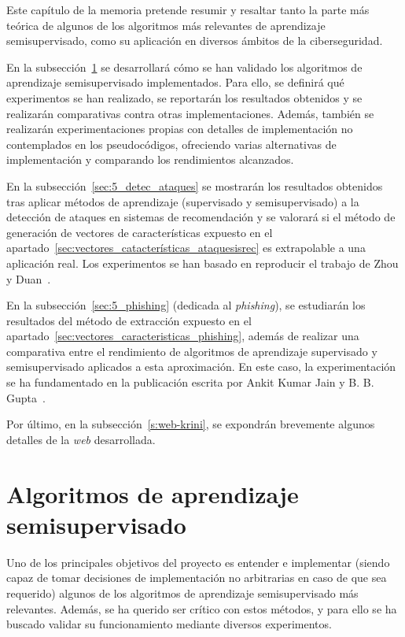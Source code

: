 \label{s:5}

Este capítulo de la memoria pretende resumir y resaltar tanto la parte más teórica de algunos de los algoritmos más relevantes de aprendizaje semisupervisado, como su aplicación en diversos ámbitos de la ciberseguridad.

En la subsección~\ref{sec:5_ssl} se desarrollará cómo se han validado los algoritmos de aprendizaje semisupervisado implementados. Para ello, se definirá qué experimentos se han realizado, se reportarán los resultados obtenidos y se realizarán comparativas contra otras implementaciones. Además, también se realizarán experimentaciones propias con detalles de implementación no contemplados en los pseudocódigos, ofreciendo varias alternativas de implementación y comparando los rendimientos alcanzados.

En la subsección~\ref{sec:5_detec_ataques} se mostrarán los resultados obtenidos tras aplicar métodos de aprendizaje (supervisado y semisupervisado) a la detección de ataques en sistemas de recomendación y se valorará si el método de generación de vectores de características expuesto en el apartado~\ref{sec:vectores_catacterísticas_ataquesisrec} es extrapolable a una aplicación real. Los experimentos se han basado en reproducir el trabajo de Zhou y Duan~\cite{zhou2021SemisupervisedRecommendationAttack}.

En la subsección~\ref{sec:5_phishing} (dedicada al \textit{phishing}), se estudiarán los resultados del método de extracción expuesto en el apartado~\ref{sec:vectores_caracteristicas_phishing}, además de realizar una comparativa entre el rendimiento de algoritmos de aprendizaje supervisado y semisupervisado aplicados a esta aproximación. En este caso, la experimentación se ha fundamentado en la publicación escrita por Ankit Kumar Jain y B. B. Gupta~\cite{featuresPhishing2018Gupta}.

Por último, en la subsección~\ref{s:web-krini}, se expondrán brevemente algunos detalles de la \textit{web} desarrollada.

\section{Algoritmos de aprendizaje semisupervisado}
\label{sec:5_ssl}

Uno de los principales objetivos del proyecto es entender e implementar (siendo capaz de tomar decisiones de implementación no arbitrarias en caso de que sea requerido) algunos de los algoritmos de aprendizaje semisupervisado más relevantes. Además, se ha querido ser crítico con estos métodos, y para ello se ha buscado validar su funcionamiento mediante diversos experimentos.


